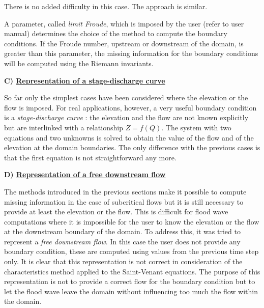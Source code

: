 There is no added difficulty in this case. The approach is similar.

\vspace{0.5cm}

A parameter, called \textit{limit Froude}, which is imposed by the user (refer to user manual) determines the choice of the method to compute the boundary conditions. If the Froude number, upstream or downstream of the domain, is greater than this parameter, the missing information for the boundary conditions will be computed using the Riemann invariants.

\vspace{0.5cm}

\textbf{C) \underline{Representation of a stage-discharge curve}}

\vspace{0.5cm}

So far only the simplest cases have been considered where the elevation or the flow is imposed. For real applications, however, a very useful boundary condition is a \textit{stage-discharge curve} : the elevation and the flow are not known explicitly but are interlinked with a relationship $Z = f(Q)$. The system with two equations and two unknowns is solved to obtain the value of the flow and of the elevation at the domain boundaries. The only difference with the previous cases is that the first equation is not straightforward any more.

\vspace{0.5cm}

\textbf{D) \underline{Representation of a free downstream flow}}

\vspace{0.5cm}

The methods introduced in the previous sections make it possible to compute missing information in the case of subcritical flows but it is still necessary to provide at least the elevation or the flow. This is difficult for flood wave computations where it is impossible for the user to know the elevation or the flow at the downstream boundary of the domain. To address this, it was tried to represent a \textit{free downstream flow}. In this case the user does not provide any boundary condition, these are computed using values from the previous time step only. It is clear that this representation is not correct in consideration of the characteristics method applied to the Saint-Venant equations. The purpose of this representation is not to provide a correct flow for the boundary condition but to let the flood wave leave the domain without influencing too much the flow within the domain.

